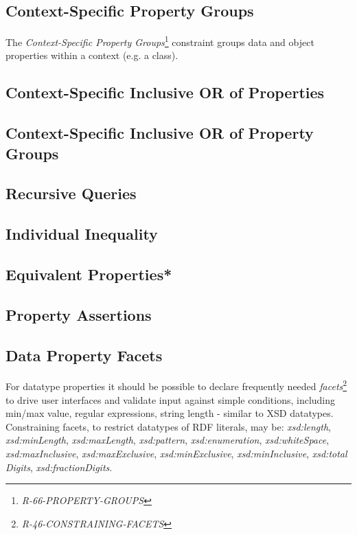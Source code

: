 \documentclass{llncs}
\begin{document}
\subsection{Context-Specific Property Groups}

The \emph{Context-Specific Property Groups}\footnote{\emph{R-66-PROPERTY-GROUPS}} constraint groups data and object properties within a context (e.g. a class).

\subsection{Context-Specific Inclusive OR of Properties}

\subsection{Context-Specific Inclusive OR of Property Groups}

\subsection{Recursive Queries}

\subsection{Individual Inequality}

\subsection{Equivalent Properties*}

\subsection{Property Assertions}

\subsection{Data Property Facets}

For datatype properties it should be possible to declare frequently needed \emph{facets}\footnote{\emph{R-46-CONSTRAINING-FACETS}} to drive user interfaces and validate input against simple conditions, including min/max value, regular expressions, string length - similar to XSD datatypes. 
Constraining facets, to restrict datatypes of RDF literals, may be: \emph{xsd:length}, \emph{xsd:minLength}, \emph{xsd:maxLength}, \emph{xsd:pattern}, \emph{xsd:enumeration}, \emph{xsd:whiteSpace}, \\ \emph{xsd:maxInclusive}, \emph{xsd:maxExclusive}, \emph{xsd:minExclusive}, \emph{xsd:minInclusive}, \emph{xsd:total} \emph{Digits}, \emph{xsd:fractionDigits}.
\end{document}
